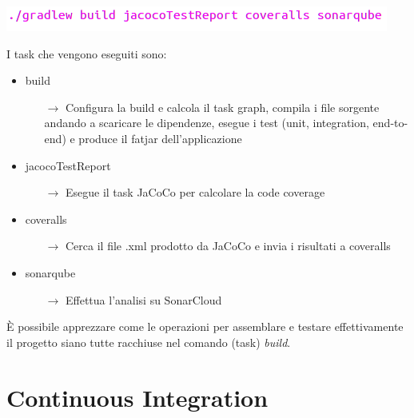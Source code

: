 \begin{minipage}{\linewidth}
	\includegraphics[width=\textwidth]{img/gradle-build.png}
\end{minipage}
\newline\newline
I task che vengono eseguiti sono:
\begin{itemize}
	\item build
	\begin{itemize}
		\item[$\rightarrow$] Configura la build e calcola il task graph, compila i file sorgente andando a scaricare le dipendenze, esegue i test (unit, integration, end-to-end) e produce il fatjar dell'applicazione
	\end{itemize}
	\item jacocoTestReport
	\begin{itemize}
		\item[$\rightarrow$] Esegue il task JaCoCo per calcolare la code coverage
	\end{itemize}
	\item coveralls
	\begin{itemize}
		\item[$\rightarrow$] Cerca il file .xml prodotto da JaCoCo e invia i risultati a coveralls
	\end{itemize}
	\item sonarqube
	\begin{itemize}
		\item[$\rightarrow$] Effettua l'analisi su SonarCloud
	\end{itemize}
\end{itemize}
È possibile apprezzare come le operazioni per assemblare e testare effettivamente il progetto siano tutte racchiuse nel comando (task) \textsl{build}.

\section{Continuous Integration}

